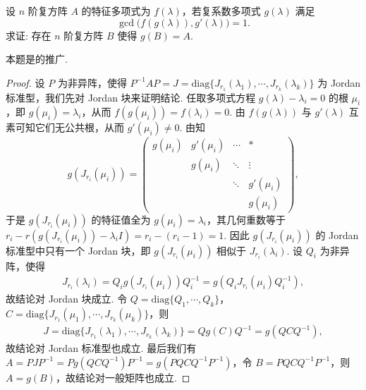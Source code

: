 \documentclass[../../main.tex]{subfiles}
\begin{document}
\begin{example}
设 \( n \) 阶复方阵 \( A \) 的特征多项式为 \( f(\lambda) \)，若复系数多项式 \( g(\lambda) \) 满足
\[
\gcd\bigl(f(g(\lambda)), g'(\lambda)\bigr) = 1.
\]
求证: 存在 \( n \) 阶复方阵 \( B \) 使得 \( g(B) = A \).
\end{example}
\begin{note}
本题是的推广.
\end{note}
\begin{proof}
设 \( P \) 为非异阵，使得 \( P^{-1}AP = J = \mathrm{diag}\{J_{r_1}(\lambda_1), \cdots, J_{r_k}(\lambda_k)\} \) 为 Jordan 标准型，我们先对 Jordan 块来证明结论. 任取多项式方程 \( g(\lambda) - \lambda_i = 0 \) 的根 \( \mu_i \)，即 \( g(\mu_i) = \lambda_i \)，从而 \( f(g(\mu_i)) = f(\lambda_i) = 0 \). 由 \( f(g(\lambda)) \) 与 \( g'(\lambda) \) 互素可知它们无公共根，从而 \( g'(\mu_i) \neq 0 \). 由知
\[
g(J_{r_i}(\mu_i)) = \begin{pmatrix} 
g(\mu_i) & g'(\mu_i) & \cdots & * \\
& g(\mu_i) & \ddots & \vdots \\
& & \ddots & g'(\mu_i) \\
& & & g(\mu_i)
\end{pmatrix},
\]
于是 \( g(J_{r_i}(\mu_i)) \) 的特征值全为 \( g(\mu_i)=\lambda_i \)，其几何重数等于 \( r_i - r(g(J_{r_i}(\mu_i)) - \lambda_i I) = r_i - (r_i - 1) = 1 \). 因此 \( g(J_{r_i}(\mu_i)) \) 的 Jordan 标准型中只有一个 Jordan 块，即 \( g(J_{r_i}(\mu_i)) \) 相似于 \( J_{r_i}(\lambda_i) \). 设 \( Q_i \) 为非异阵，使得 
\begin{align*}
J_{r_i}(\lambda_i) = Q_i g(J_{r_i}(\mu_i)) Q_i^{-1} = g(Q_i J_{r_i}(\mu_i) Q_i^{-1}),
\end{align*}
故结论对 Jordan 块成立. 令 \( Q = \mathrm{diag}\{Q_1, \cdots, Q_k\} \)，\( C = \mathrm{diag}\{J_{r_1}(\mu_1), \cdots, J_{r_k}(\mu_k)\} \)，则
\begin{align*}
J = \mathrm{diag}\{J_{r_1}(\lambda_1), \cdots, J_{r_k}(\lambda_k)\} = Q g(C) Q^{-1} = g(Q C Q^{-1}),
\end{align*}
故结论对 Jordan 标准型也成立. 最后我们有 \( A = P J P^{-1} = P g(Q C Q^{-1}) P^{-1} = g(P Q C Q^{-1} P^{-1}) \)，令 \( B = P Q C Q^{-1} P^{-1} \)，则 \( A = g(B) \)，故结论对一般矩阵也成立. 
\end{proof}
\end{document}
